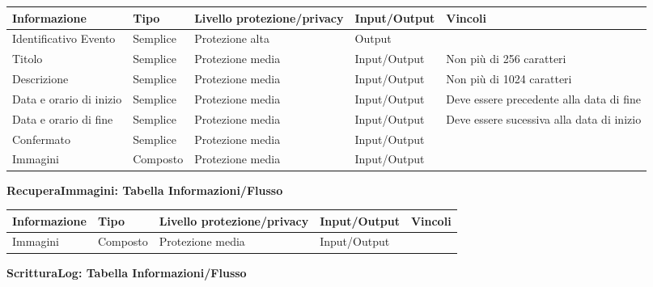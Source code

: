 \begin{tabular} {|P{3cm}|P{2.5cm}|P{3cm}|P{3cm}|P{3cm}|}
    \hline
    \textbf{Informazione}   & \textbf{Tipo} & \textbf{Livello protezione/privacy} & \textbf{Input/Output} & \textbf{Vincoli}                          \\
    \hline
    Identificativo Evento   & Semplice      & Protezione alta                     & Output                &                                           \\
    \hline
    Titolo                  & Semplice      & Protezione media                    & Input/Output          & Non più di 256 caratteri                  \\
    \hline
    Descrizione             & Semplice      & Protezione media                    & Input/Output          & Non più di 1024 caratteri                 \\
    \hline
    Data e orario di inizio & Semplice      & Protezione media                    & Input/Output          & Deve essere precedente alla data di fine  \\
    \hline
    Data e orario di fine   & Semplice      & Protezione media                    & Input/Output          & Deve essere sucessiva alla data di inizio \\
    \hline
    Confermato              & Semplice      & Protezione media                    & Input/Output          &                                           \\
    \hline
    Immagini                & Composto      & Protezione media                    & Input/Output          &                                           \\
    \hline
\end{tabular}
\hfill \break

\textbf{RecuperaImmagini: Tabella Informazioni/Flusso}
\hfill \break

\begin{tabular} {|P{3cm}|P{2.5cm}|P{3cm}|P{3cm}|P{3cm}|}
    \hline
    \textbf{Informazione} & \textbf{Tipo} & \textbf{Livello protezione/privacy} & \textbf{Input/Output} & \textbf{Vincoli} \\
    \hline
    Immagini              & Composto      & Protezione media                    & Input/Output          &                  \\
    \hline
\end{tabular}
\hfill \break

\textbf{ScritturaLog: Tabella Informazioni/Flusso}
\hfill \break

